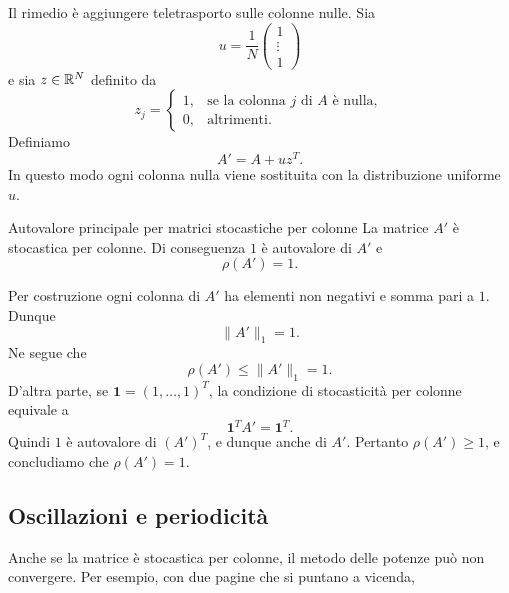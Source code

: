 \documentclass[a4paper]{article}
\begin{document}
Il rimedio è aggiungere teletrasporto sulle colonne nulle. Sia
\[
    u=\frac1N
    \begin{pmatrix}1\\ \vdots\\ 1
    \end{pmatrix}
\]
e sia \(z\in\mathbb{R}^N\) definito da
\[
    z_j=
    \begin{cases}
        1, & \text{se la colonna } j \text{ di } A \text{ è nulla},\\
        0, & \text{altrimenti}.
    \end{cases}
\]
Definiamo
\[
    A'=A+uz^T.
\]
In questo modo ogni colonna nulla viene sostituita con la distribuzione uniforme \(u\).

\begin{snippettheorem}{Autovalore principale per matrici stocastiche per colonne}
    La matrice \(A'\) è stocastica per colonne. Di conseguenza \(1\) è autovalore di \(A'\) e
    \[
        \rho(A')=1.
    \]
\end{snippettheorem}

\begin{snippetproof}{}
    Per costruzione ogni colonna di \(A'\) ha elementi non negativi e somma pari a \(1\). Dunque
    \[
        \|A'\|_1=1.
    \]
    Ne segue che
    \[
        \rho(A')\leq \|A'\|_1=1.
    \]
    D'altra parte, se \(\mathbf 1=(1,
    \ldots,1)^T\), la condizione di stocasticità per colonne equivale a
    \[
        \mathbf 1^T A'=\mathbf 1^T.
    \]
    Quindi \(1\) è autovalore di \((A')^T\), e dunque anche di \(A'\). Pertanto \(\rho(A')\geq 1\), e concludiamo che \(\rho(A')=1\).
\end{snippetproof}

\subsection{Oscillazioni e periodicità}

Anche se la matrice è stocastica per colonne, il metodo delle potenze può non convergere. Per esempio, con due pagine che si puntano a vicenda,

\begin{center}
\end{center}
\end{document}
